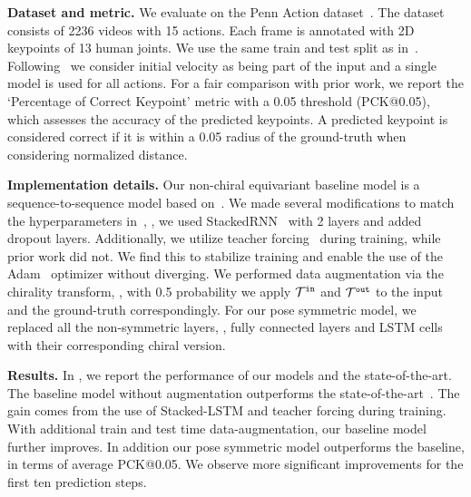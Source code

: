 \documentclass{article}
\begin{document}
\textbf{Dataset and metric.}
We evaluate on the Penn Action dataset~\cite{zhang2013actemes}. The dataset consists of  2236 videos with 15 actions. Each frame is annotated with 2D keypoints of 13 human joints. We use the same train and test split as in~\cite{chao2017forecasting, chiu2019action}. Following~\citet{chiu2019action} we consider initial velocity as being part of the input and a single model is used for all actions. 
For a fair comparison with prior work, we report  the `Percentage of Correct Keypoint' metric with a 0.05 threshold (PCK@0.05), which assesses the accuracy of the predicted keypoints. A predicted keypoint is considered correct if it is within a 0.05 radius of the ground-truth when considering normalized distance.

\textbf{Implementation details.} Our non-chiral equivariant baseline model is a sequence-to-sequence model based on~\cite{martinez2017human}. We made several modifications to match the hyperparameters in~\cite{chiu2019action}, \ie, we used StackedRNN~\cite{pascanu2014howto} with 2 layers and added dropout layers. Additionally, we utilize teacher forcing~\cite{williams1989learning} during training, while prior work did not. We find this to stabilize training and enable the use of the Adam~\cite{kingma2015adam, ams_grad} optimizer without diverging. We performed data augmentation via the chirality transform, \ie, with 0.5 probability we apply $\mathcal{T}^{\tt in}$ and $\mathcal{T}^{\tt out}$ to the input and the ground-truth correspondingly.
For our pose symmetric model, we replaced all the non-symmetric layers, \eg, fully connected layers and LSTM cells with their corresponding
chiral version.


\textbf{Results.}
In , we report the performance of our models and the state-of-the-art. The baseline model without augmentation outperforms the state-of-the-art~\cite{chiu2019action}. The gain comes from the use of Stacked-LSTM and teacher forcing during training. With  additional  train and test time data-augmentation, our baseline model further improves. In addition our pose symmetric model outperforms the baseline, in terms of average PCK@0.05. We observe more significant improvements for the first ten prediction steps. 
\end{document}
